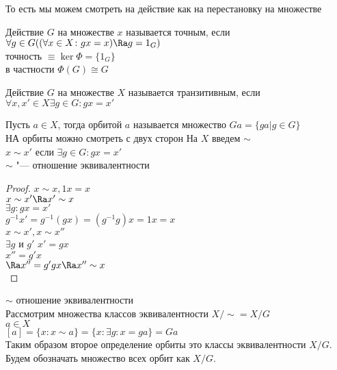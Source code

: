 То есть мы можем смотреть на действие как на перестановку на множестве\\

\begin{Def}
Действие $G$ на множестве $x$ называется точным, если 
$\forall g \in G ((\forall x \in X\colon gx = x) \Ra g = 1_{G})$\\
точность $\equiv \ker \Phi = \{1_G\}$\\
в частности $\Phi(G) \cong G$ \\
\end{Def}

\begin{Def}
Действие $G$ на множестве $X$ называется транзитивным, если 
$\forall x, x' \in X \exists g \in G \colon gx = x'$
\end{Def}
\begin{Def}
Пусть $a \in X$, тогда орбитой $a$ называется
множество $Ga = \{ga| g \in G\}$ \\

НА орбиты можно смотреть с двух сторон
На $X$ введем $\sim$\\
    $x \sim x'$ если $\exists g \in G \colon gx = x'$\\

$\sim$  "--- отношение эквивалентности\\
\end{Def}
\begin{proof}
$x \sim x, 1x = x$\\
$x \sim x' \Ra x' \sim x$\\
$\exists g \colon gx = x'$\\
$g^{-1}x' = g^{-1}(gx) = (g^{-1}g)x = 1x = x$\\

$x \sim x', x \sim x''$\\
$\exists g$ и $g'$
$x' = gx$\\
$x'' = g'x$\\
$\Ra x'' = g'gx \Ra x'' \sim x$\\
\end{proof}
$\sim$ отношение эквивалентности\\
Рассмотрим множества классов эквивалентности $X / \sim = X / G$\\
$a \in X$\\
$[a] = \{x \colon x \sim a\} = \{x \colon \exists g \colon x = ga\} = Ga$ \\

Таким образом второе определение орбиты это классы эквивалентности $X/G$.
Будем обозначать множество всех орбит как $X/G$.

